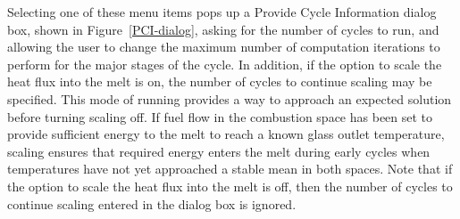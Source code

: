 \documentclass[12pt]{article}
\newcommand{\dialog}[1]{\textsf{#1}}
\numberwithin{equation}{section}
\begin{document}
Selecting one of these menu items pops up a \dialog{Provide Cycle Information} dialog box, shown in Figure~\ref{PCI-dialog}, asking for the number of cycles to run, and allowing the user to change the maximum number of computation iterations to perform for the major stages of the cycle. In addition, if the option to scale the heat flux into the melt is on, the number of cycles to continue scaling may be specified. This mode of running provides a way to approach an expected solution before turning scaling off. If fuel flow in the combustion space has been set to provide sufficient energy to the melt to reach a known glass outlet temperature, scaling ensures that required energy enters the melt during early cycles when temperatures have not yet approached a stable mean in both spaces. Note that if the option to scale the heat flux into the melt is off, then the number of cycles to continue scaling entered in the dialog box is ignored.\\
\end{document}
